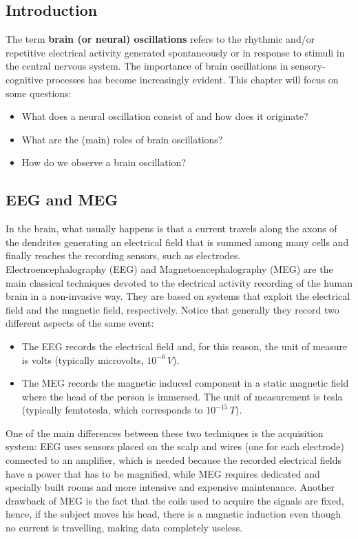 \subsection{Introduction}
The term \textbf{brain (or neural) oscillations} refers to the rhythmic and/or repetitive
electrical activity generated spontaneously or in response to stimuli in the central nervous
system. The importance of brain oscillations in sensory-cognitive processes has become
increasingly evident. This chapter will focus on some questions:
\begin{itemize}
    \item What does a neural oscillation consist of and how does it originate?
    \item What are the (main) roles of brain oscillations?
    \item How do we observe a brain oscillation?
\end{itemize}

\subsection{EEG and MEG}
In the brain, what usually happens is that a current travels along the axons of the dendrites
generating an electrical field that is summed among many cells and finally reaches the
recording sensors, such as electrodes.\\

Electroencephalography (EEG) and Magnetoencephalography (MEG) are the main classical
techniques devoted to the electrical activity recording of the human brain in a non-invasive
way. They are based on systems that exploit the electrical field and the magnetic field,
respectively. Notice that generally they record two different aspects of the same event:
\begin{itemize}
    \item The EEG records the electrical field and, for this reason, the unit of measure
          is volts (typically
          microvolts, \(10^{-6}\,V\)).
    \item The MEG records the magnetic induced component in a static magnetic field where
          the head of the person is immersed. The unit of measurement is tesla (typically
          femtotesla, which corresponds to \(10^{-15}\,T\)).
\end{itemize}
One of the main differences between these two techniques is the acquisition system: EEG
uses sensors placed on the scalp and wires (one for each electrode) connected to an amplifier,
which is needed because the recorded electrical fields have a power that has to be magnified,
while MEG requires dedicated and specially built rooms and more intensive and expensive
maintenance. Another drawback of MEG is the fact that the coils used to acquire the signals
are fixed, hence, if the subject moves his head, there is a magnetic induction even though
no current is travelling, making data completely useless.\\

